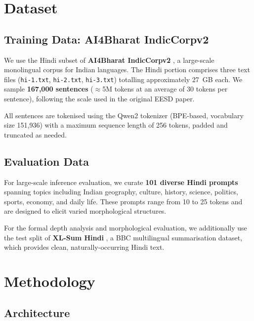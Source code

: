 \documentclass[11pt]{article}
\begin{document}
\section{Dataset}
\label{sec:dataset}

\subsection{Training Data: AI4Bharat IndicCorpv2}

We use the Hindi subset of \textbf{AI4Bharat IndicCorpv2} \cite{doddapaneni2021indicnlp}, a large-scale monolingual corpus for Indian languages.  The Hindi portion comprises three text files (\texttt{hi-1.txt}, \texttt{hi-2.txt}, \texttt{hi-3.txt}) totalling approximately 27~GB each.  We sample \textbf{167,000 sentences} ($\approx$5M tokens at an average of 30 tokens per sentence), following the scale used in the original EESD paper.

All sentences are tokenised using the Qwen2 tokenizer (BPE-based, vocabulary size 151,936) with a maximum sequence length of 256 tokens, padded and truncated as needed.

\subsection{Evaluation Data}

For large-scale inference evaluation, we curate \textbf{101 diverse Hindi prompts} spanning topics including Indian geography, culture, history, science, politics, sports, economy, and daily life.  These prompts range from 10 to 25 tokens and are designed to elicit varied morphological structures.

For the formal depth analysis and morphological evaluation, we additionally use the test split of \textbf{XL-Sum Hindi} \cite{hasan2021xlsum}, a BBC multilingual summarisation dataset, which provides clean, naturally-occurring Hindi text.


\section{Methodology}
\label{sec:methodology}

\subsection{Architecture}
\end{document}
